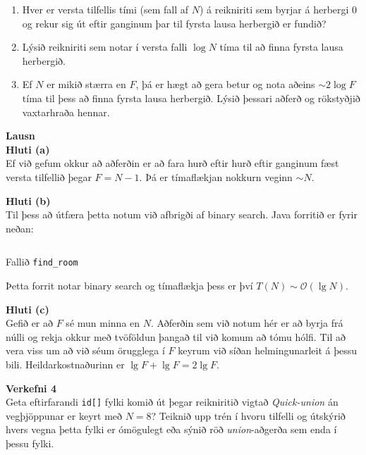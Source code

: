 \documentclass[12pt, a4paper, hidelinks]{article}
\begin{document}
\begin{enumerate}[label=(\alph*)]
    \item Hver er versta tilfellis tími (sem fall af $N$) á reikniriti sem byrjar á herbergi $0$ og rekur sig út eftir ganginum þar til fyrsta
    lausa herbergið er fundið?
    \item Lýsið reikniriti sem notar í versta falli $\log N$ tíma til að finna fyrsta lausa herbergið.
    \item Ef $N$ er mikið stærra en $F$, þá er hægt að gera betur og nota aðeins $\sim 2 \log F$ tíma til þess að finna fyrsta lausa herbergið.
    Lýsið þessari aðferð og rökstyðjið vaxtarhraða hennar.
\end{enumerate}

\medskip
\noindent
\textbf{\large Lausn} \medskip \\
\textbf{Hluti (a)} \medskip \\
Ef við gefum okkur að aðferðin er að fara hurð eftir hurð eftir ganginum fæst versta tilfellið þegar
$F = N-1$. Þá er tímaflækjan nokkurn veginn $\sim N$.

\newpage
\noindent
\textbf{Hluti (b)} \medskip \\
Til þess að útfæra þetta notum við afbrigði af binary search. Java forritið er fyrir neðan:

\begin{listing}[ht!]
    \centering
    \inputminted[firstline=5, lastline=18, linenos]{java}{../src/V3/HotelRoom.java}
    \caption{Fallið \texttt{find\_room}}
\end{listing}

\noindent
Þetta forrit notar binary search og tímaflækja þess er því $T(N) \sim \mathcal O(\lg N)$.

\medskip
\noindent
\textbf{Hluti (c)} \medskip \\
Gefið er að $F$ sé mun minna en $N$. Aðferðin sem við notum hér er að byrja frá núlli og rekja okkur
með tvöföldun þangað til við komum að tómu hólfi. Til að vera viss um að við séum örugglega í $F$ keyrum
við síðan helmingunarleit á þessu bili. Heildarkostnaðurinn er $\lg F + \lg F =  2\lg F$.

\newpage
\noindent
\textbf{\large Verkefni 4} \medskip \\
Geta eftirfarandi \texttt{id[]} fylki komið út þegar reikniritið vigtað \emph{Quick-union}
án vegþjöppunar er keyrt með $N = 8$? Teiknið upp trén í hvoru tilfelli og útskýrið hvers vegna
þetta fylki er ómögulegt eða sýnið röð \emph{union}-aðgerða sem enda í þessu fylki.
\end{document}
